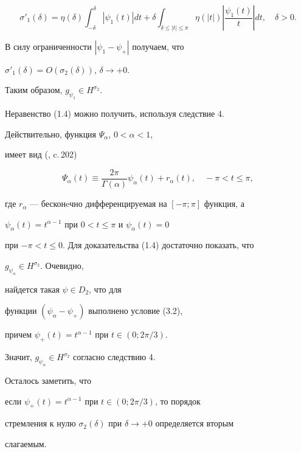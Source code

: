 $$


\sigma'_1(\delta)=\eta(\delta)\int_{-\delta}^\delta|\psi_1(t)|dt+


\delta\int_{\delta\le|t|\le\pi}\eta(|t|)\left|\frac{\psi_1(t)}{t}\right|dt,


\quad \delta>0.


$$


В силу ограниченности $|\psi_1-\psi_+|$ получаем, что


$\sigma'_1(\delta)=O(\sigma_2(\delta))$, $\delta\to+0$.


Таким образом, $g_{\psi_1}\in H^{\sigma_2}$.





\begin{note}


Неравенство (1.4) можно получить, используя следствие 4.


Действительно, функция $\Psi_\alpha$, $0<\alpha<1$,


имеет вид (\cite{zig}, c.\,202)


$$


\Psi_\alpha(t)\equiv\frac{2\pi}{\Gamma(\alpha)}\psi_\alpha(t)+r_\alpha(t),


\quad -\pi<t\le \pi,


$$


где $r_\alpha$ --- бесконeчно дифференцируемая на $[-\pi;\pi]$ функция, а


$\psi_\alpha(t)=t^{\alpha-1}$ при $0<t\le\pi$ и $\psi_\alpha(t)=0$


при $-\pi<t\le 0$. Для доказательства (1.4) достаточно показать, что


$g_{\psi_\alpha}\in H^{\sigma_2}$. Очевидно,


найдется такая $\psi\in D_2$, что для


функции $(\psi_\alpha-\psi_+)$ выполнено условие (3.2),


причем $\psi_+(t)=t^{\alpha-1}$ при $t\in(0;2\pi/3)$.


Значит, $g_{\psi_\alpha}\in H^{\sigma_2}$ согласно следствию 4.


Осталось заметить, что


если $\psi_+(t)=t^{\alpha-1}$ при $t\in(0;2\pi/3)$, то порядок


стремления к нулю $\sigma_2(\delta)$ при $\delta\to+0$ определяется вторым


слагаемым.


\end{note}





